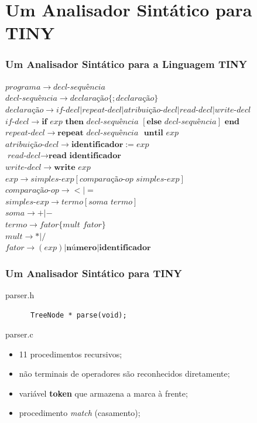\documentclass[table]{beamer}
\begin{document}
\section{Um Analisador Sintático para TINY}
\begin{frame}
   \frametitle{Um Analisador Sintático para a Linguagem TINY}
   $programa \to \textit{decl-sequência}$ \\
   $\textit{decl-sequência} \to \textit{declaração} \{; \textit{declaração} \}$ \\
   $\textit{declaração} \to \textit{if-decl} | \textit{repeat-decl} | \textit{atribuição-decl} | \textit{read-decl} | \textit{write-decl}$
   $\textit{if-decl} \to \textbf{if } exp \textbf{ then } \textit{decl-sequência } [\textbf{else } \textit{decl-sequência} ] \textbf{ end}$
   $\textit{repeat-decl} \to \textbf{repeat } \textit{decl-sequência } \textbf{ until } exp$ \\
   $\textit{atribuição-decl} \to \textbf{identificador} := \textit{exp}$ \\
   $\textit{read-decl} \to \textbf{read identificador}$ \\
   $\textit{write-decl} \to \textbf{write } exp$ \\
   $exp \to \textit{simples-exp} [\textit{comparação-op simples-exp}]$ \\
   $\textit{comparação-op} \to < | =$ \\
   $\textit{simples-exp} \to \textit{termo} [\textit{soma termo}]$ \\
   $soma \to +|-$ \\
   $termo \to fator \{\textit{mult fator}\}$ \\
   $\textit{mult} \to *|/$ \\
   $fator \to (exp) | \textbf{número} | \textbf{identificador}$
\end{frame}

\begin{frame}[fragile]
   \frametitle{Um Analisador Sintático para TINY}
   \begin{block}{parser.h}
      \begin{verbatim}
      TreeNode * parse(void);
      \end{verbatim}
   \end{block}
   \begin{block}{parser.c}
      \begin{itemize}
         \item 11 procedimentos recursivos;
	 \item não terminais de operadores são reconhecidos diretamente;
	 \item variável \textbf{token} que armazena a marca à frente;
	 \item procedimento \textit{match} (casamento);
      \end{itemize}
   \end{block}
\end{frame}
\end{document}
